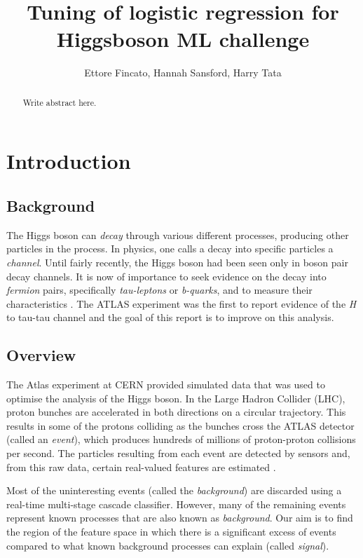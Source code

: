 \documentclass[]{article}
\title{Tuning of logistic regression for Higgsboson ML challenge}
\author{Ettore Fincato, Hannah Sansford, Harry Tata}
\begin{document}
\maketitle

\begin{abstract}

Write abstract here.

\end{abstract}

\section{Introduction}

\subsection{Background}

The Higgs boson can \textit{decay} through various different processes, producing other particles in the process. In physics, one calls a decay into specific particles a \textit{channel}. Until fairly recently, the Higgs boson had been seen only in boson pair decay channels. It is now of importance to seek evidence on the decay into \textit{fermion} pairs, specifically \textit{tau-leptons} or \textit{b-quarks}, and to measure their characteristics \cite{higgs-challenge}. The ATLAS experiment \cite{ATLAS-experiment} was the first to report evidence of the \textit{H} to tau-tau channel and the goal of this report is to improve on this analysis.


\subsection{Overview}

The Atlas experiment at CERN provided simulated data that was used to optimise the analysis of the Higgs boson. In the Large Hadron Collider (LHC), proton bunches are accelerated in both directions on a circular trajectory. This results in some of the protons colliding as the bunches cross the ATLAS detector (called an \textit{event}), which produces hundreds of millions of proton-proton collisions per second. The particles resulting from each event are detected by sensors and, from this raw data, certain real-valued features are estimated \cite{higgs-challenge}.

Most of the uninteresting events (called the \textit{background}) are discarded using a real-time multi-stage cascade classifier. However, many of the remaining events represent known processes that are also known as \textit{background}. Our aim is to find the region of the feature space in which there is a significant excess of events compared to what known background processes can explain (called \textit{signal}).
\end{document}
